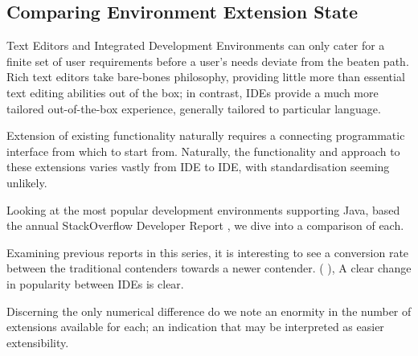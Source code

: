 \subsection{Comparing Environment Extension State}

Text Editors and Integrated Development Environments can only cater for a finite set of user requirements before a user's needs deviate from the beaten path. Rich text editors take bare-bones philosophy, providing little more than essential text editing abilities out of the box; in contrast, IDEs provide a much more tailored out-of-the-box experience, generally tailored to particular language. 

Extension of existing functionality naturally requires a connecting programmatic interface from which to start from. Naturally, the functionality and approach to these extensions varies vastly from IDE to IDE, with standardisation seeming unlikely. 

Looking at the most popular development environments supporting Java, based the annual StackOverflow Developer Report \parencite{stackOverflowDevReport2019}, we dive into a comparison of each.

Examining previous reports in this series, it is interesting to see a conversion rate between the traditional contenders towards a newer contender. (\citeauthor{stackOverflowDevReport2018} ), A clear change in popularity between IDEs is clear. 

Discerning the only numerical difference do we note an enormity in the number of extensions available for each; an indication that may be interpreted as easier extensibility.











